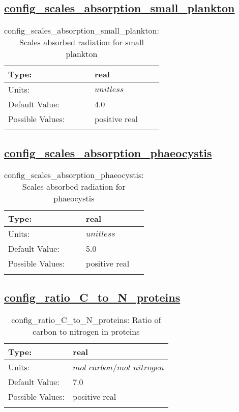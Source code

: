 \subsection[config\_scales\_absorption\_small\_plankton]{\hyperref[sec:nm_tab_biogeochemistry]{config\_scales\_absorption\_small\_plankton}}
\label{subsec:nm_sec_config_scales_absorption_small_plankton}
\begin{center}
\begin{longtable}{| p{2.0in} || p{4.0in} |}
    \hline
    Type: & real \\
    \hline
    Units: & $unitless$ \\
    \hline
    Default Value: & 4.0 \\
    \hline
    Possible Values: & positive real \\
    \hline
    \caption{config\_scales\_absorption\_small\_plankton: Scales absorbed radiation for small plankton}
\end{longtable}
\end{center}
\subsection[config\_scales\_absorption\_phaeocystis]{\hyperref[sec:nm_tab_biogeochemistry]{config\_scales\_absorption\_phaeocystis}}
\label{subsec:nm_sec_config_scales_absorption_phaeocystis}
\begin{center}
\begin{longtable}{| p{2.0in} || p{4.0in} |}
    \hline
    Type: & real \\
    \hline
    Units: & $unitless$ \\
    \hline
    Default Value: & 5.0 \\
    \hline
    Possible Values: & positive real \\
    \hline
    \caption{config\_scales\_absorption\_phaeocystis: Scales absorbed radiation for phaeocystis}
\end{longtable}
\end{center}
\subsection[config\_ratio\_C\_to\_N\_proteins]{\hyperref[sec:nm_tab_biogeochemistry]{config\_ratio\_C\_to\_N\_proteins}}
\label{subsec:nm_sec_config_ratio_C_to_N_proteins}
\begin{center}
\begin{longtable}{| p{2.0in} || p{4.0in} |}
    \hline
    Type: & real \\
    \hline
    Units: & $mol$ $carbon/mol$ $nitrogen$ \\
    \hline
    Default Value: & 7.0 \\
    \hline
    Possible Values: & positive real \\
    \hline
    \caption{config\_ratio\_C\_to\_N\_proteins: Ratio of carbon to nitrogen in proteins}
\end{longtable}
\end{center}
